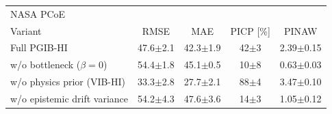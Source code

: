 \begin{tabular}{l c c c c}
\hline
\multicolumn{5}{l}{NASA PCoE}\\
 Variant & RMSE & MAE & PICP [\%] & PINAW \\
\hline
Full PGIB-HI & 47.6$\pm$2.1 & 42.3$\pm$1.9 & 42$\pm$3 & 2.39$\pm$0.15 \\
w/o bottleneck ($\beta=0$) & 54.4$\pm$1.8 & 45.1$\pm$0.5 & 10$\pm$8 & 0.63$\pm$0.03 \\
w/o physics prior (VIB-HI) & 33.3$\pm$2.8 & 27.7$\pm$2.1 & 88$\pm$4 & 3.47$\pm$0.10 \\
w/o epistemic drift variance & 54.2$\pm$4.3 & 47.6$\pm$3.6 & 14$\pm$3 & 1.05$\pm$0.12 \\
\hline
\end{tabular}
